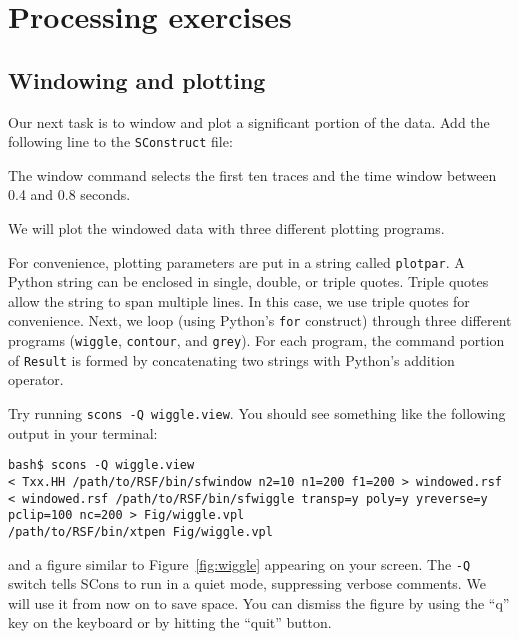 \section{Processing exercises}

\subsection{Windowing and plotting}

Our next task is to window and plot a significant portion of the data. Add the
following line to the \texttt{SConstruct} file:



The window command selects the first ten traces and the time window between
0.4 and 0.8 seconds.

We will plot the windowed data with three different plotting programs.



For convenience, plotting parameters are put in a string called
\texttt{plotpar}. A Python string can be enclosed in single, double,
or triple quotes. Triple quotes allow the string to span multiple
lines. In this case, we use triple quotes for convenience. Next, we
loop (using Python's \texttt{for} construct) through three different
programs (\texttt{wiggle}, \texttt{contour}, and \texttt{grey}). For
each program, the command portion of \texttt{Result} is formed by
concatenating two strings with Python's addition operator.

Try running \texttt{scons -Q wiggle.view}. You should see something like the
following output in your terminal:
\begin{verbatim}
bash$ scons -Q wiggle.view
< Txx.HH /path/to/RSF/bin/sfwindow n2=10 n1=200 f1=200 > windowed.rsf
< windowed.rsf /path/to/RSF/bin/sfwiggle transp=y poly=y yreverse=y 
pclip=100 nc=200 > Fig/wiggle.vpl
/path/to/RSF/bin/xtpen Fig/wiggle.vpl
\end{verbatim}
and a figure similar to Figure~\ref{fig:wiggle} appearing on your
screen. The \texttt{-Q} switch tells SCons to run in a quiet mode,
suppressing verbose comments. We will use it from now on to save
space. You can dismiss the figure by using the ``q'' key on the
keyboard or by hitting the ``quit'' button.

